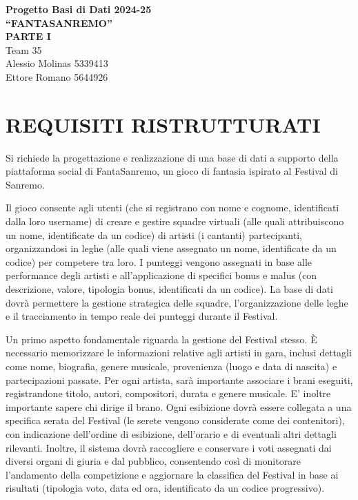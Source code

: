 \documentclass[a4paper,12pt]{article}
\begin{document}
\begin{center}
    {\LARGE \textbf{Progetto Basi di Dati 2024-25}}\\[.5cm]
    {\Large \textbf{“FANTASANREMO”}}\\[.5cm]
    {\Large \textbf{PARTE I}}\\[.8cm]
    Team 35\\[.3cm]
    Alessio Molinas 5339413\\
    Ettore Romano 5644926
\end{center}

\vspace{1cm}

\section{REQUISITI RISTRUTTURATI}
Si richiede la progettazione e realizzazione di una base di dati a supporto della piattaforma social di FantaSanremo, un gioco di fantasia ispirato al Festival di Sanremo.

Il gioco consente agli utenti (che si registrano con nome e cognome, identificati dalla loro username) di creare e gestire squadre virtuali (alle quali attribuiscono un nome, identificate da un codice) di artisti (i cantanti) partecipanti, organizzandosi in leghe (alle quali viene assegnato un nome, identificate da un codice) per competere tra loro. I punteggi vengono assegnati in base alle performance degli artisti e all’applicazione di specifici bonus e malus (con descrizione, valore, tipologia bonus, identificati da un codice). La base di dati dovrà permettere la gestione strategica delle squadre, l’organizzazione delle leghe e il tracciamento in tempo reale dei punteggi durante il Festival.

Un primo aspetto fondamentale riguarda la gestione del Festival stesso. È necessario memorizzare le informazioni relative agli artisti in gara, inclusi dettagli come nome, biografia, genere musicale, provenienza (luogo e data di nascita) e partecipazioni passate. Per ogni artista, sarà importante associare i brani eseguiti, registrandone titolo, autori, compositori, durata e genere musicale. E' inoltre importante sapere chi dirige il brano. Ogni esibizione dovrà essere collegata a una specifica serata del Festival (le serete vengono considerate come dei contenitori), con indicazione dell’ordine di esibizione, dell’orario e di eventuali altri dettagli rilevanti.
Inoltre, il sistema dovrà raccogliere e conservare i voti assegnati dai diversi organi di giuria e dal pubblico, consentendo così di monitorare l’andamento della competizione e aggiornare la classifica del Festival in base ai risultati (tipologia voto, data ed ora, identificato da un codice progressivo).
\end{document}
